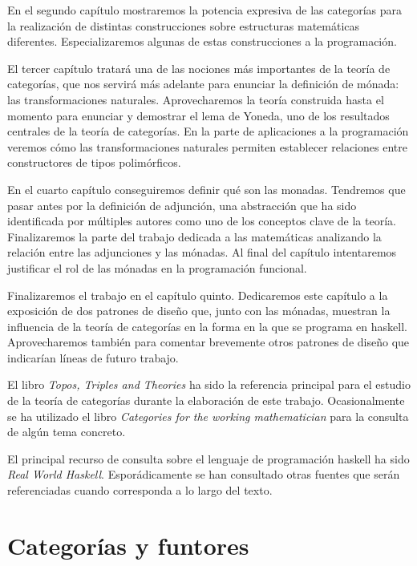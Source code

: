 \documentclass[12pt]{book}
\begin{document}
En el segundo capítulo mostraremos la potencia expresiva de
las categorías para la realización de distintas construcciones
sobre estructuras matemáticas diferentes. Especializaremos algunas
de estas construcciones a la programación.

El tercer capítulo tratará una de las nociones más importantes
de la teoría de categorías, que nos servirá
más adelante para enunciar la definición de mónada:
las transformaciones naturales.
Aprovecharemos la teoría construida hasta el momento
para enunciar y demostrar el lema de Yoneda, uno de los resultados
centrales de la teoría de categorías. En la parte de aplicaciones
a la programación veremos cómo las transformaciones naturales
permiten establecer relaciones entre constructores de tipos
polimórficos.

En el cuarto capítulo conseguiremos definir
qué son las monadas. Tendremos que pasar
antes por la definición de adjunción, una abstracción que ha sido
identificada por múltiples autores como uno de los conceptos clave
de la teoría. Finalizaremos la parte del trabajo dedicada a las
matemáticas analizando la relación entre las adjunciones y las
mónadas. Al final del capítulo intentaremos justificar el rol
de las mónadas en la programación funcional.

Finalizaremos el trabajo en el capítulo quinto. Dedicaremos
este capítulo a la exposición de dos patrones de diseño que,
junto con las mónadas, muestran la influencia de la teoría de
categorías en la forma en la que se programa en haskell. Aprovecharemos
también para comentar brevemente otros patrones de diseño
que indicarían líneas de futuro trabajo.

El libro \textit{Topos, Triples and Theories} ha sido la referencia
principal para el estudio de la teoría de categorías durante
la elaboración de este trabajo. Ocasionalmente
se ha utilizado el libro
\textit{Categories for the working mathematician}
para la consulta de algún tema concreto.

El principal recurso de consulta sobre el lenguaje de programación
haskell ha sido \textit{Real World Haskell}. Esporádicamente se
han consultado otras fuentes que serán referenciadas cuando corresponda
a lo largo del texto.

\tableofcontents



\chapter{Categorías y funtores}
\end{document}
